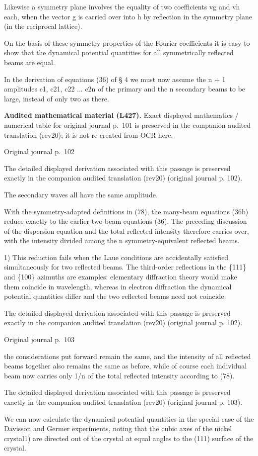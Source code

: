 \documentclass[10pt]{article}
\newcommand{\origpage}[1]{\par\medskip\noindent\hfill{\small\color{notegray}Original journal p.~#1}\hfill\mbox{}\par\smallskip}
\newcommand{\mathref}[2]{\par\smallskip\noindent\colorbox{gray!8}{\parbox{0.95\linewidth}{\small\color{notegray}\textbf{Audited mathematical material (L#1).} Exact displayed mathematics / numerical table for original journal p.~#2 is preserved in the companion audited translation (rev20); it is not re-created from OCR here.}}\par\smallskip}
\begin{document}
Likewise a symmetry plane involves the equality of two coefficients vg and vh each, when the vector g is carried over into h by reflection in the symmetry plane (in the reciprocal lattice).\par
On the basis of these symmetry properties of the Fourier coefficients it is easy to show that the dynamical potential quantities for all symmetrically reflected beams are equal.\par
In the derivation of equations (36) of § 4 we must now assume the n + 1 amplitudes c1, c21, c22 ... c2n of the primary and the n secondary beams to be large, instead of only two as there.\par
\mathref{427}{101}
\origpage{102}
The detailed displayed derivation associated with this passage is preserved exactly in the companion audited translation (rev20) (original journal p. 102).\par
The secondary waves all have the same amplitude.\par
With the symmetry-adapted definitions in (78), the many-beam equations (36b) reduce exactly to the earlier two-beam equations (36). The preceding discussion of the dispersion equation and the total reflected intensity therefore carries over, with the intensity divided among the n symmetry-equivalent reflected beams.\par
\noindent\footnotesize 1) This reduction fails when the Laue conditions are accidentally satisfied simultaneously for two reflected beams. The third-order reflections in the \{111\} and \{100\} azimuths are examples: elementary diffraction theory would make them coincide in wavelength, whereas in electron diffraction the dynamical potential quantities differ and the two reflected beams need not coincide.\par\normalsize
The detailed displayed derivation associated with this passage is preserved exactly in the companion audited translation (rev20) (original journal p. 102).\par
\origpage{103}
the considerations put forward remain the same, and the intensity of all reflected beams together also remains the same as before, while of course each individual beam now carries only 1/n of the total reflected intensity according to (78).\par
The detailed displayed derivation associated with this passage is preserved exactly in the companion audited translation (rev20) (original journal p. 103).\par
We can now calculate the dynamical potential quantities in the special case of the Davisson and Germer experiments, noting that the cubic axes of the nickel crystal1) are directed out of the crystal at equal angles to the (111) surface of the crystal.\par
\end{document}
